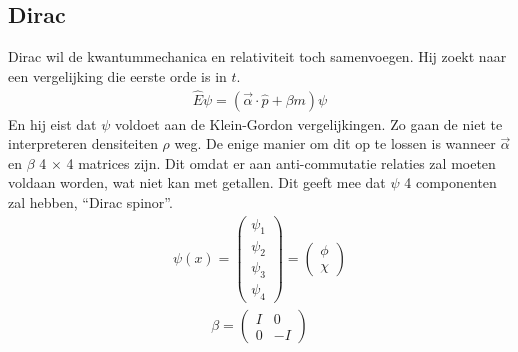 \documentclass[../main.tex]{subfiles}
\begin{document}
\subsection{Dirac}%
\label{sub:dirac}

Dirac wil de kwantummechanica en relativiteit toch samenvoegen. Hij zoekt naar een vergelijking die eerste orde is in $t$.
\begin{equation}
    \begin{aligned}
        \label{eq:dirac_vergelijking}
        \hat E \psi = (\vec{\alpha} \cdot \hat{p} + \beta m)\psi
    \end{aligned}
\end{equation}
En hij eist dat $\psi$ voldoet aan de Klein-Gordon vergelijkingen. Zo gaan de niet te interpreteren densiteiten $\rho$ weg. De enige manier om dit op te lossen is wanneer $\vec{\alpha}$ en $\beta$ 4 $\times$ 4 matrices zijn. Dit omdat er aan anti-commutatie relaties zal moeten voldaan worden, wat niet kan met getallen. Dit geeft mee dat $\psi$ 4 componenten zal hebben, ``Dirac spinor''.
\begin{equation}
    \begin{aligned}
        \label{eq:dirac_spinor}
        \psi(x)=
        \begin{pmatrix}
            \psi_1\\
            \psi_2\\
            \psi_3\\
            \psi_4
        \end{pmatrix}
        =
        \begin{pmatrix}
            \phi\\
            \chi
        \end{pmatrix}
    \end{aligned}
\end{equation}
\begin{equation}
    \begin{aligned}
        \label{eq:dirac_beta}
        \beta=
        \begin{pmatrix}
            I & 0\\
            0 & -I
        \end{pmatrix}
    \end{aligned}
\end{equation}
\end{document}
